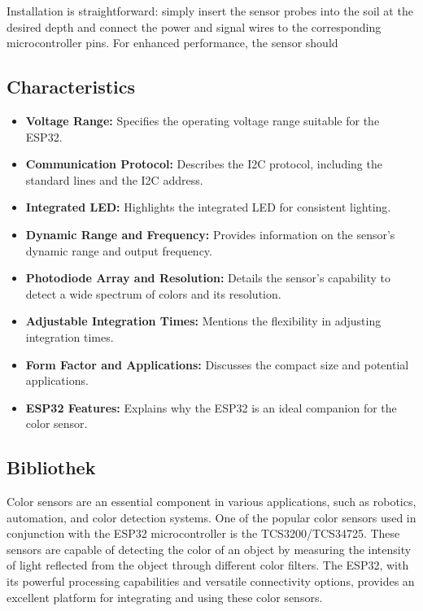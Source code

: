 Installation is straightforward: simply insert the sensor probes into the soil at the desired depth and connect the power and signal wires to the corresponding microcontroller pins. For enhanced performance, the sensor should

\subsection*{ Characteristics}
\begin{itemize}
	\item \textbf{Voltage Range:} Specifies the operating voltage range suitable for the ESP32.
	\item \textbf{Communication Protocol:} Describes the I2C protocol, including the standard lines and the I2C address.
	\item \textbf{Integrated LED:} Highlights the integrated LED for consistent lighting.
	\item \textbf{Dynamic Range and Frequency:}  Provides information on the sensor's dynamic range and output frequency.
   \item \textbf{Photodiode Array and Resolution:}  Details the sensor's capability to detect a wide spectrum of colors and its resolution.
   \item \textbf{Adjustable Integration Times:} Mentions the flexibility in adjusting integration times.
   \item \textbf{Form Factor and Applications:}  Discusses the compact size and potential applications.
   \item \textbf{ESP32 Features: } Explains why the ESP32 is an ideal companion for the color sensor.
\end{itemize}


\subsection{Bibliothek}

Color sensors are an essential component in various applications, such as robotics, automation, and color detection systems. One of the popular color sensors used in conjunction with the ESP32 microcontroller is the TCS3200/TCS34725. These sensors are capable of detecting the color of an object by measuring the intensity of light reflected from the object through different color filters. The ESP32, with its powerful processing capabilities and versatile connectivity options, provides an excellent platform for integrating and using these color sensors.

